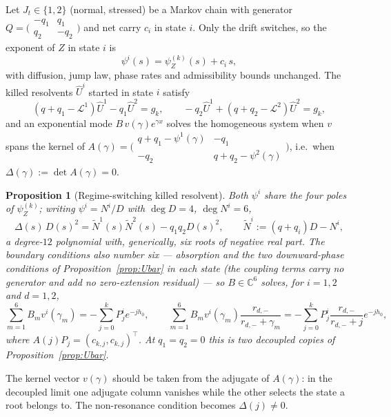 \documentclass[11pt]{article}
\theoremstyle{plain}
\newtheorem{proposition}[theorem]{Proposition}
\theoremstyle{definition}
\theoremstyle{remark}
\begin{document}
Let $J_t\in\{1,2\}$ (normal, stressed) be a Markov chain with generator
$Q=\bigl(\begin{smallmatrix}-q_1 & q_1\\ q_2 & -q_2\end{smallmatrix}\bigr)$ and net carry $c_i$ in
state $i$. Only the drift switches, so the exponent of $Z$ in state $i$ is
\begin{equation}\label{eq:psi-regime}
\psi^i(s)=\psi_Z^{(k)}(s)+c_i\,s,
\end{equation}
with diffusion, jump law, phase rates and admissibility bounds unchanged. The killed resolvents
$\widehat U^i$ started in state $i$ satisfy
\begin{equation}\label{eq:regime-system}
(q+q_1-\mathcal L^{1})\widehat U^{1}-q_1\widehat U^{2}=g_k,
\qquad
-q_2\widehat U^{1}+(q+q_2-\mathcal L^{2})\widehat U^{2}=g_k ,
\end{equation}
and an exponential mode $B\,v(\gamma)e^{\gamma x}$ solves the homogeneous system when $v$ spans the
kernel of
$A(\gamma)=\bigl(\begin{smallmatrix} q+q_1-\psi^1(\gamma) & -q_1\\ -q_2 & q+q_2-\psi^2(\gamma)\end{smallmatrix}\bigr)$,
i.e.\ when $\Delta(\gamma):=\det A(\gamma)=0$.

\begin{proposition}[Regime-switching killed resolvent]\label{prop:regime}
Both $\psi^i$ share the four poles of $\psi_Z^{(k)}$; writing $\psi^i=N^i/D$ with $\deg D=4$,
$\deg N^i=6$,
\[
\Delta(s)\,D(s)^2=\widetilde N^1(s)\widetilde N^2(s)-q_1q_2D(s)^2,
\qquad
\widetilde N^i:=(q+q_i)D-N^i,
\]
a degree-$12$ polynomial with, generically, six roots of negative real part. The boundary conditions
also number six --- absorption and the two downward-phase conditions of Proposition~\ref{prop:Ubar}
in each state (the coupling terms carry no generator and add no zero-extension residual) --- so
$B\in\mathbb C^6$ solves, for $i=1,2$ and $d=1,2$,
\[
\sum_{m=1}^{6}B_m v^i(\gamma_m) = -\!\sum_{j=0}^{k}P^i_j e^{-jh_0},
\qquad
\sum_{m=1}^{6}B_m v^i(\gamma_m)\frac{r_{d,-}}{r_{d,-}+\gamma_m}
= -\!\sum_{j=0}^{k}P^i_j\frac{r_{d,-}}{r_{d,-}+j}e^{-jh_0},
\]
where $A(j)P_j=(c_{k,j},c_{k,j})^\top$. At $q_1=q_2=0$ this is two decoupled copies of
Proposition~\ref{prop:Ubar}.
\end{proposition}

\noindent
The kernel vector $v(\gamma)$ should be taken from the adjugate of $A(\gamma)$: in the decoupled
limit one adjugate column vanishes while the other selects the state a root belongs to. The
non-resonance condition becomes $\Delta(j)\neq0$.
\end{document}
